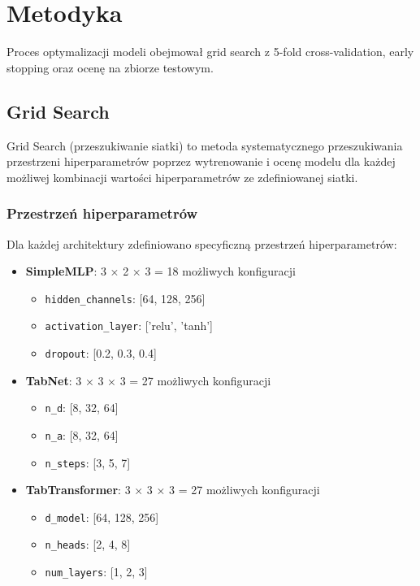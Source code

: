 \section{Metodyka}

Proces optymalizacji modeli obejmował grid search z 5-fold cross-validation, early stopping oraz ocenę na zbiorze testowym.

\subsection{Grid Search}

Grid Search (przeszukiwanie siatki) to metoda systematycznego przeszukiwania przestrzeni hiperparametrów poprzez wytrenowanie i ocenę modelu dla każdej możliwej kombinacji wartości hiperparametrów ze zdefiniowanej siatki.

\subsubsection{Przestrzeń hiperparametrów}

Dla każdej architektury zdefiniowano specyficzną przestrzeń hiperparametrów:

\begin{itemize}
    \item \textbf{SimpleMLP}: 3 × 2 × 3 = 18 możliwych konfiguracji
    \begin{itemize}
        \item \texttt{hidden\_channels}: [64, 128, 256]
        \item \texttt{activation\_layer}: ['relu', 'tanh']
        \item \texttt{dropout}: [0.2, 0.3, 0.4]
    \end{itemize}
    
    \item \textbf{TabNet}: 3 × 3 × 3 = 27 możliwych konfiguracji
    \begin{itemize}
        \item \texttt{n\_d}: [8, 32, 64]
        \item \texttt{n\_a}: [8, 32, 64]
        \item \texttt{n\_steps}: [3, 5, 7]
    \end{itemize}
    
    \item \textbf{TabTransformer}: 3 × 3 × 3 = 27 możliwych konfiguracji
    \begin{itemize}
        \item \texttt{d\_model}: [64, 128, 256]
        \item \texttt{n\_heads}: [2, 4, 8]
        \item \texttt{num\_layers}: [1, 2, 3]
    \end{itemize}
\end{itemize}


